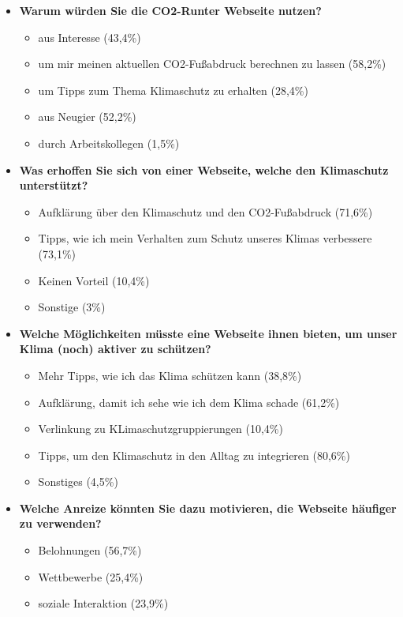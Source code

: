 \begin{itemize}
    \item \textbf{Warum würden Sie die CO2-Runter Webseite nutzen?}
    \begin{itemize}
        \item aus Interesse (43,4\%)
        \item um mir meinen aktuellen CO2-Fußabdruck berechnen zu lassen (58,2\%)
        \item um Tipps zum Thema Klimaschutz zu erhalten (28,4\%)
        \item aus Neugier (52,2\%)
        \item durch Arbeitskollegen (1,5\%)
    \end{itemize}
    \item \textbf{Was erhoffen Sie sich von einer Webseite, welche den Klimaschutz unterstützt?}
    \begin{itemize}
        \item Aufklärung über den Klimaschutz und den CO2-Fußabdruck (71,6\%)
        \item Tipps, wie ich mein Verhalten zum Schutz unseres Klimas verbessere (73,1\%)
        \item Keinen Vorteil (10,4\%)
        \item Sonstige (3\%)
    \end{itemize}
    \item \textbf{Welche Möglichkeiten müsste eine Webseite ihnen bieten, um unser Klima (noch) aktiver zu schützen?}
    \begin{itemize}
        \item Mehr Tipps, wie ich das Klima schützen kann (38,8\%)
        \item Aufklärung, damit ich sehe wie ich dem Klima schade (61,2\%)
        \item Verlinkung zu KLimaschutzgruppierungen (10,4\%)
        \item Tipps, um den Klimaschutz in den Alltag zu integrieren (80,6\%)
        \item Sonstiges (4,5\%)
    \end{itemize}
    \item \textbf{Welche Anreize könnten Sie dazu motivieren, die Webseite häufiger zu verwenden?}
    \begin{itemize}
        \item Belohnungen (56,7\%)
        \item Wettbewerbe (25,4\%)
        \item soziale Interaktion (23,9\%)

\end{itemize}
\end{itemize}
